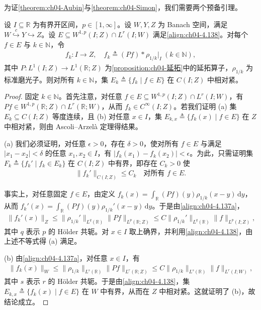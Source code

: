 \documentclass[../../main.tex]{subfiles}%
\begin{document}
为证\cref{theorem:ch04-Aubin}与\cref{theorem:ch04-Simon}，我们需要两个预备引理。

\begin{lemma}\label{lemma:ch04-磨光紧}
设 $I\subseteq\mathbb{R}$ 为有界开区间，$p\in[1,\infty]$。设 $W,Y,Z$ 为 Banach 空间，满足 $W\overset{c}{\hookrightarrow}Y\hookrightarrow Z$。设 $E\subseteq W^{1,p}(I;Z)\cap L^r(I;W)$ 满足\eqref{align:ch04-4.138}。对每个 $f\in E$ 与 $k\in\mathbb{N}$，令
\begin{align*}
f_k:I\to Z,\quad f_k\triangleq (Pf)*\rho_{1/k}|_I\ (k\in\mathbb{N}),
\end{align*}
其中 $P:L^1(I;Z)\to L^1(\mathbb{R};Z)$ 为\cref{proposition:ch04-延拓}中的延拓算子，$\rho_{1/k}$ 为标准磨光子。则对所有 $k\in\mathbb{N}$，集 $E_k\triangleq \{f_k\mid f\in E\}$ 在 $C(I;Z)$ 中相对紧。
\end{lemma}

\begin{proof}
固定 $k\in\mathbb{N}$。首先注意，对任意 $f\in E\subseteq W^{1,p}(I;Z)\cap L^r(I;W)$，有 $Pf\in W^{1,p}(\mathbb{R};Z)\cap L^r(\mathbb{R};W)$，从而 $f_k\in C^\infty(I;Z)$。若我们证明 (a) 集 $E_k\subseteq C(I;Z)$ 等度连续，且 (b) 对任意 $x\in I$，集 $E_{k,x}\triangleq \{f_k(x)\mid f\in E\}$ 在 $Z$ 中相对紧，则由 Ascoli--Arzelà 定理得结果。

(a) 我们必须证明，对任意 $\epsilon>0$，存在 $\delta>0$，使对所有 $f\in E$ 与满足 $|x_1-x_2|<\delta$ 的任意 $x_1,x_2\in I$，有 $|f_k(x_1)-f_k(x_2)|<\epsilon$。为此，只需证明集 $F_k\triangleq \{f_k'\mid f_k\in E_k\}$ 在 $C(I;Z)$ 中有界，即存在 $C_k>0$ 使
\begin{align}
\|f_k'\|_{C(I;Z)}\leqslant C_k\quad\text{对所有 }f\in E. \label{align:ch04-4.140}
\end{align}

事实上，对任意固定 $f\in E$，由定义 $f_k(x)=\int_{\mathbb{R}}(Pf)(y)\rho_{1/k}(x-y)\,\mathrm{d}y$，从而 $f_k'(x)=\int_{\mathbb{R}}(Pf)(y)\rho_{1/k}'(x-y)\,\mathrm{d}y$。于是由\eqref{align:ch04-4.137a}，
\begin{align*}
\|f_k'(x)\|_Z\leqslant\|\rho_{1/k}'\|_{L^q(\mathbb{R})}\|Pf\|_{L^p(\mathbb{R};Z)}
\leqslant C\|\rho_{1/k}'\|_{L^q(\mathbb{R})}\|f\|_{L^p(I;Z)},
\end{align*}
其中 $q$ 表示 $p$ 的 Hölder 共轭。对 $x\in I$ 取上确界，并利用\eqref{align:ch04-4.138}，由上述不等式得 (a) 满足。

(b) 由\eqref{align:ch04-4.137a}，对任意 $x\in I$，有
\begin{align*}
\|f_k(x)\|_W\leqslant\|\rho_{1/k}\|_{L^s(\mathbb{R})}\|Pf\|_{L^r(\mathbb{R};Z)}
\leqslant C\|\rho_{1/k}\|_{L^s(\mathbb{R})}\|f\|_{L^r(I;W)},
\end{align*}
其中 $s$ 表示 $r$ 的 Hölder 共轭。于是由\eqref{align:ch04-4.138}，集 $E_{k,x}\triangleq \{f_k(x)\mid f\in E\}$ 在 $W$ 中有界，从而在 $Z$ 中相对紧。这就证明了 (b)，故结论成立。
\end{proof}
\end{document}

